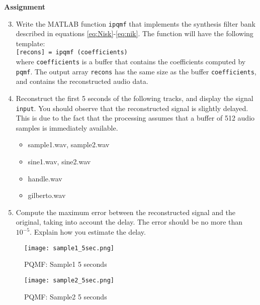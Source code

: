 \documentclass{article} %
\begin{document}
\begin{framed}
\textbf{Assignment}
\begin{enumerate}
\setcounter{enumi}{2}
\item Write the MATLAB function \verb|ipqmf| that implements the synthesis
filter bank described in equations \ref{eq:Nisk}-\ref{eq:nik}. 
The function will have the following template:
\\[2ex]
\verb|[recons] = ipqmf (coefficients)|
\\[2ex]

where \texttt{coefficients} is a buffer that contains the coefficients
computed by \texttt{pqmf}. The output array \texttt{recons} has the same
size as the buffer \texttt{coefficients}, and contains the reconstructed
audio data.

\item Reconstruct the first 5 seconds of the following tracks, and display
the signal \texttt{input}. You should observe that the reconstructed
signal is slightly delayed. This is due to the fact that the processing
assumes that a buffer of 512 audio samples is immediately available.

\begin{itemize}
\item sample1.wav, sample2.wav
\item sine1.wav, sine2.wav
\item handle.wav
\item gilberto.wav
\end{itemize}

\item Compute the maximum error between the reconstructed signal and the
original, taking into account the delay. The error should be no more than
$10^{-5}$. Explain how you estimate the delay. 

\end{enumerate}
\end{framed}


\begin{figure}[H]
\centering
\texttt{[image: sample1\_5sec.png]}
\caption{PQMF: Sample1 5 seconds}
\label{fig:samp1PQMF}
\end{figure}
\begin{figure}[H]
\centering
\texttt{[image: sample2\_5sec.png]}
\caption{PQMF: Sample2 5 seconds}
\label{fig:samp2PQMF}
\end{figure}
\end{document}

